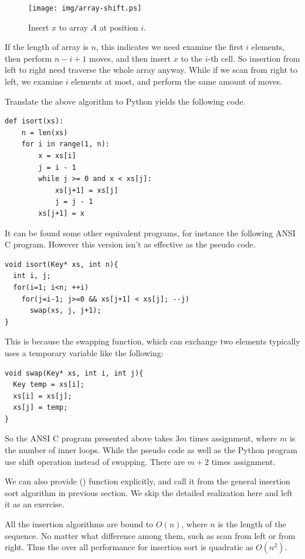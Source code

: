 \documentclass{article}
\begin{document}
\begin{figure}[htbp]
  \centering
  \texttt{[image: img/array-shift.ps]}
  \caption{Insert $x$ to array $A$ at position $i$.}
  \label{fig:array-shift}
\end{figure}

If the length of array is $n$, this indicates we need examine the
first $i$ elements, then perform
$n-i+1$ moves, and then insert $x$ to the $i$-th cell. So insertion
from left to right need traverse the whole array anyway.
While if we scan from right to
left, we examine $i$ elements at most, and perform the same
amount of moves.

Translate the above algorithm to Python yields the following code.

\lstset{language=Python}
\begin{lstlisting}
def isort(xs):
    n = len(xs)
    for i in range(1, n):
        x = xs[i]
        j = i - 1
        while j >= 0 and x < xs[j]:
            xs[j+1] = xs[j]
            j = j - 1
        xs[j+1] = x
\end{lstlisting}

It can be found some other equivalent programs, for instance the following
ANSI C program. However this version isn't as effective as the pseudo code.

\lstset{language=C}
\begin{lstlisting}
void isort(Key* xs, int n){
  int i, j;
  for(i=1; i<n; ++i)
    for(j=i-1; j>=0 && xs[j+1] < xs[j]; --j)
      swap(xs, j, j+1);
}
\end{lstlisting}

This is because the swapping function, which can exchange two elements
typically uses a temporary variable like the following:

\begin{lstlisting}
void swap(Key* xs, int i, int j){
  Key temp = xs[i];
  xs[i] = xs[j];
  xs[j] = temp;
}
\end{lstlisting}

So the ANSI C program presented above takes $3m$ times assignment, where $m$
is the number of inner loops. While the pseudo code as well as the Python
program use shift operation instead of swapping. There are $m+2$ times
assignment.

We can also provide () function explicitly, and call it
from the general insertion sort algorithm in previous section. We skip
the detailed realization here and left it as an exercise.

All the insertion algorithms are bound to $O(n)$, where $n$ is the length of
the sequence. No matter what difference among them, such as scan from left
or from right. Thus the over all performance for insertion sort is quadratic
as $O(n^2)$.
\end{document}
